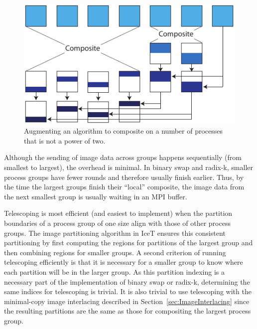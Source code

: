 \documentclass{acm_proc_article-sp}
\begin{document}
\begin{figure}[htbp]
  \centering
  \includegraphics{images/TelescopeDiagram}
  \caption{Augmenting an algorithm to composite on a number of processes
    that is not a power of two.}
  \label{fig:TelescopeDiagram}
\end{figure}

Although the sending of image data across groups happens sequentially (from
smallest to largest), the overhead is minimal.  In binary swap and radix-k,
smaller process groups have fewer rounds and therefore usually finish
earlier.  Thus, by the time the largest groups finish their ``local''
composite, the image data from the next smallest group is usually waiting
in an MPI buffer.

Telescoping is most efficient (and easiest to implement) when the partition
boundaries of a process group of one size align with those of other process
groups.  The image partitioning algorithm in IceT ensures this consistent
partitioning by first computing the regions for partitions of the largest
group and then combining regions for smaller groups.  A second criterion of
running telescoping efficiently is that it is necessary for a smaller group
to know where each partition will be in the larger group.  As this
partition indexing is a necessary part of the implementation of binary swap
or radix-k, determining the same indices for telescoping is trivial.  It is
also trivial to use telescoping with the minimal-copy image interlacing
described in Section~\ref{sec:ImageInterlacing} since the resulting
partitions are the same as those for compositing the largest process group.
\end{document}
